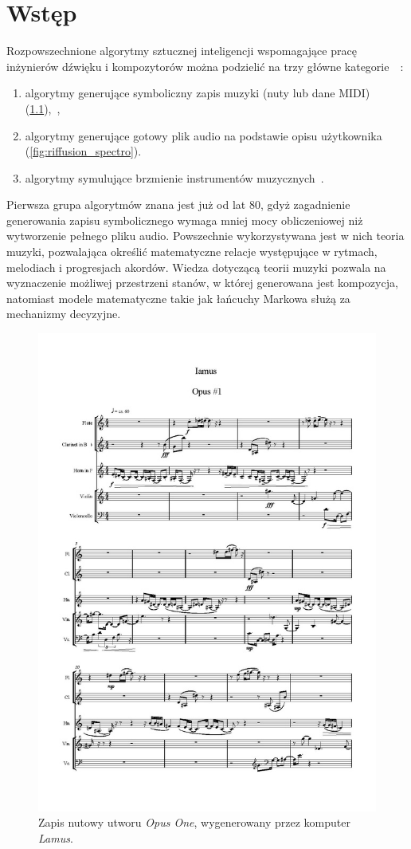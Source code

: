 \chapter{Wstęp}

Rozpowszechnione algorytmy sztucznej inteligencji wspomagające pracę inżynierów dźwięku i kompozytorów
można podzielić na trzy główne kategorie~\cite{analysis_generative}~\label{traditional_algos}:

\begin{enumerate}
    \item algorytmy generujące symboliczny zapis muzyki (nuty lub dane MIDI) (\ref{fig:lamus_notes}),~\cite{zhang2023language},
    \item algorytmy generujące gotowy plik audio na podstawie opisu użytkownika (\ref{fig:riffusion_spectro}).
    \item algorytmy symulujące brzmienie instrumentów muzycznych~\cite{engel2017neural}.
\end{enumerate}

Pierwsza grupa algorytmów znana jest już od lat 80, gdyż zagadnienie generowania zapisu symbolicznego wymaga mniej mocy obliczeniowej niż wytworzenie pełnego pliku audio.
Powszechnie wykorzystywana jest w nich teoria muzyki, pozwalająca określić matematyczne relacje występujące w rytmach, melodiach i progresjach akordów.
Wiedza dotyczącą teorii muzyki pozwala na wyznaczenie możliwej przestrzeni stanów, w której generowana jest kompozycja,
natomiast modele matematyczne takie jak łańcuchy Markowa służą za mechanizmy decyzyjne.

\begin{figure}[H]
    \centering
    \includegraphics[width=0.4\linewidth]{rys01/lamus_notes.jpg}
    \caption{
      Zapis nutowy utworu \textit{Opus One},
      wygenerowany przez komputer \textit{Lamus}.
    }\label{fig:lamus_notes}
\end{figure}


